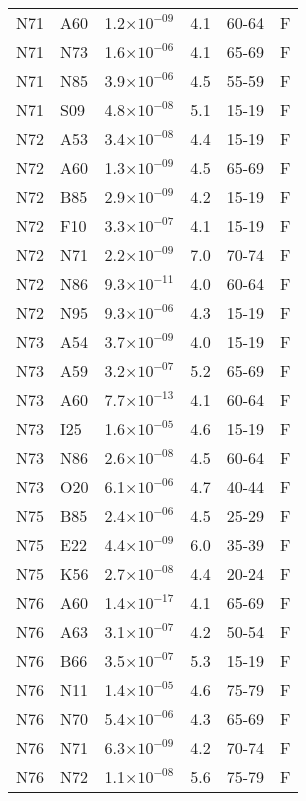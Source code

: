 \begin{longtable}{lllrll}
   N71 & A60 & 1.2$\times10^{-09}$ & 4.1 & 60-64 & F \\ 
   N71 & N73 & 1.6$\times10^{-06}$ & 4.1 & 65-69 & F \\ 
   N71 & N85 & 3.9$\times10^{-06}$ & 4.5 & 55-59 & F \\ 
   N71 & S09 & 4.8$\times10^{-08}$ & 5.1 & 15-19 & F \\ 
   N72 & A53 & 3.4$\times10^{-08}$ & 4.4 & 15-19 & F \\ 
   N72 & A60 & 1.3$\times10^{-09}$ & 4.5 & 65-69 & F \\ 
   N72 & B85 & 2.9$\times10^{-09}$ & 4.2 & 15-19 & F \\ 
   N72 & F10 & 3.3$\times10^{-07}$ & 4.1 & 15-19 & F \\ 
   N72 & N71 & 2.2$\times10^{-09}$ & 7.0 & 70-74 & F \\ 
   N72 & N86 & 9.3$\times10^{-11}$ & 4.0 & 60-64 & F \\ 
   N72 & N95 & 9.3$\times10^{-06}$ & 4.3 & 15-19 & F \\ 
   N73 & A54 & 3.7$\times10^{-09}$ & 4.0 & 15-19 & F \\ 
   N73 & A59 & 3.2$\times10^{-07}$ & 5.2 & 65-69 & F \\ 
   N73 & A60 & 7.7$\times10^{-13}$ & 4.1 & 60-64 & F \\ 
   N73 & I25 & 1.6$\times10^{-05}$ & 4.6 & 15-19 & F \\ 
   N73 & N86 & 2.6$\times10^{-08}$ & 4.5 & 60-64 & F \\ 
   N73 & O20 & 6.1$\times10^{-06}$ & 4.7 & 40-44 & F \\ 
   N75 & B85 & 2.4$\times10^{-06}$ & 4.5 & 25-29 & F \\ 
   N75 & E22 & 4.4$\times10^{-09}$ & 6.0 & 35-39 & F \\ 
   N75 & K56 & 2.7$\times10^{-08}$ & 4.4 & 20-24 & F \\ 
   N76 & A60 & 1.4$\times10^{-17}$ & 4.1 & 65-69 & F \\ 
   N76 & A63 & 3.1$\times10^{-07}$ & 4.2 & 50-54 & F \\ 
   N76 & B66 & 3.5$\times10^{-07}$ & 5.3 & 15-19 & F \\ 
   N76 & N11 & 1.4$\times10^{-05}$ & 4.6 & 75-79 & F \\ 
   N76 & N70 & 5.4$\times10^{-06}$ & 4.3 & 65-69 & F \\ 
   N76 & N71 & 6.3$\times10^{-09}$ & 4.2 & 70-74 & F \\ 
   N76 & N72 & 1.1$\times10^{-08}$ & 5.6 & 75-79 & F \\ 

\end{longtable}
